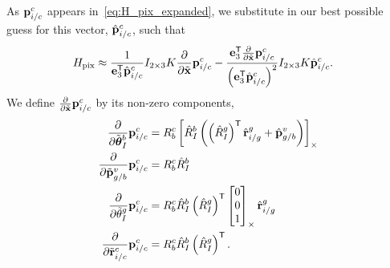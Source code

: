 As $\boldsymbol{\mathrm{p}}_{i/c}^c$ appears in~\eqref{eq:H_pix_expanded}, we substitute in our
best possible guess for this vector, $\hat{\boldsymbol{\mathrm{p}}}_{i/c}^c$, such that
\begin{align}
  H_{\text{pix}} 
  &\approx
  \frac{1}{\boldsymbol{\mathrm{e}}_3^{\mathsf{T}} \hat{\boldsymbol{\mathrm{p}}}_{i/c}^c} I_{2 \times 3} K
 \frac{\partial}{\partial \tilde{\boldsymbol{\mathrm{x}}}} \boldsymbol{\mathrm{p}}_{i/c}^c 
 - \frac{\boldsymbol{\mathrm{e}}_3^{\mathsf{T}} \frac{\partial}{\partial \tilde{\boldsymbol{\mathrm{x}}}} 
 \boldsymbol{\mathrm{p}}_{i/c}^c}{\left( \boldsymbol{\mathrm{e}}_3^{\mathsf{T}}
 \hat{\boldsymbol{\mathrm{p}}}_{i/c}^c \right)^2 } I_{2 \times 3} K
 \hat{\boldsymbol{\mathrm{p}}}_{i/c}^c. 
\end{align}
We define $\frac{\partial}{\partial \tilde{\boldsymbol{\mathrm{x}}}} \boldsymbol{\mathrm{p}}_{i/c}^c$ by its
non-zero components,
\begin{align*}
  \frac{\partial}{\partial \tilde{\boldsymbol{\mathrm{\theta}}}_I^b } \boldsymbol{\mathrm{p}}_{i/c}^c
  &=
  R_b^c \left[  \hat{R}_I^b \left( \left( \hat{R}_I^g \right)^{\mathsf{T}}
  \hat{\boldsymbol{\mathrm{r}}}_{i/g}^g + \hat{\boldsymbol{\mathrm{p}}}_{g/b}^v \right)  \right]_{\times} \\
  \frac{\partial}{\partial \tilde{\boldsymbol{\mathrm{p}}}_{g/b}^v} \boldsymbol{\mathrm{p}}_{i/c}^c
  &=
  R_b^c \hat{R}_I^b \\
  \frac{\partial}{\partial \tilde{\theta}_I^g} \boldsymbol{\mathrm{p}}_{i/c}^c
  &=
  R_b^c \hat{R}_I^b \left( \hat{R}_I^g \right)^{\mathsf{T}}
  \left[ \begin{matrix} 0 \\ 0 \\ 1 \end{matrix} \right]_{\times} \hat{\boldsymbol{\mathrm{r}}}_{i/g}^g \\
  \frac{\partial}{\partial \tilde{\boldsymbol{\mathrm{r}}}_{i/c}^c} \boldsymbol{\mathrm{p}}_{i/c}^c
  &=
  R_b^c \hat{R}_I^b \left( \hat{R}_I^g \right)^{\mathsf{T}} .
\end{align*}




